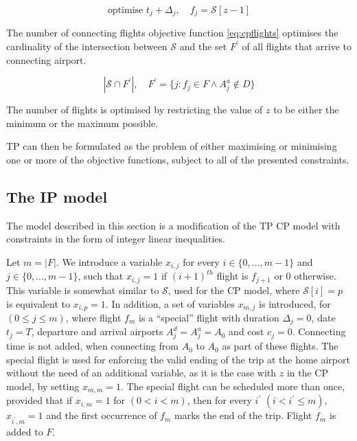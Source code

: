 \documentclass{mpaper}
\begin{document}
\vspace{-1mm}
\begin{equation}
\label{eq:cptrip}
\textrm{optimise } t_j + \Delta_j , \quad f_j = \mathcal{S}[z-1]
\end{equation}
\vspace{-1mm}

The number of connecting flights objective function \ref{eq:cpflights} optimises the cardinality of the intersection between $\mathcal{S}$ and the set $F^\prime$ of all flights that arrive to connecting airport.

\vspace{-1mm}
\begin{equation}
\label{eq:cpflights}
|\mathcal{S} \cap F^\prime|, \quad F^\prime = \{j : f_j \in F \wedge A^a_j \notin D\}
\end{equation}
\vspace{-1mm}

The number of flights is optimised by restricting the value of $z$ to be either the minimum or the maximum possible.

TP can then be formulated as the problem of either maximising or minimising one or more of the objective functions, subject to all of the presented constraints.

\subsection{The IP model}
\label{subsec:tpip}
The model described in this section is a modification of the TP CP model with constraints in the form of integer linear inequalities.

Let $m = |F|$. We introduce a variable $x_{i,j}$ for every $i \in \{0,...,m-1\}$ and  $j \in \{0,...,m-1\}$, such that $x_{i,j} = 1$ if $(i+1)^{th}$ flight is $f_{j+1}$ or 0 otherwise. This variable is somewhat similar to $\mathcal{S}$, used for the CP model, where $\mathcal{S}[i] = p$ is equivalent to $x_{i,p} = 1$. In addition, a set of variables $x_{m,j}$ is introduced, for $(0 \leq j \leq m)$, where flight $f_{m}$ is a ``special'' flight with duration $\Delta_{j} = 0$, date $t_{j} = T$, departure and arrival airports $A^{d}_{j} = A^{a}_{j} = A_{0}$ and cost $c_{j} = 0$. Connecting time is not added, when connecting from $A_{0}$ to $A_{0}$ as part of these flights. The special flight is used for enforcing the valid ending of the trip at the home airport without the need of an additional variable, as it is the case with $z$ in the CP model, by setting $x_{m,m} = 1$. The special flight can be scheduled more than once, provided that if $x_{i,m} = 1$ for $(0 < i < m)$, then for every $i^\prime$ $(i < i^\prime \leq m)$, $x_{i^\prime,m} = 1$ and the first occurrence of $f_m$ marks the end of the trip. Flight $f_{m}$ is added to $F$.
\end{document}
